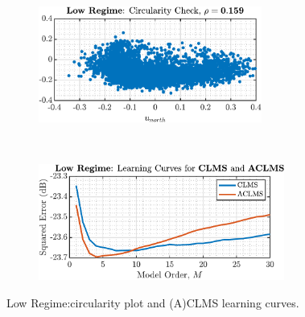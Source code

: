 \begin{enumerate}[label=\alph*), leftmargin=*]
\begin{figure}[h]
    \centering
    \begin{subfigure}{0.49\textwidth}
        \centering
        \includegraphics[height=1.5in]{report/widely-linear-filtering-and-adaptive-spectrum-estimation/complex-LMS-and-widely-linear-modelling/assets/b/circularity_1}
    \end{subfigure}
    ~
    \begin{subfigure}{0.49\textwidth}
        \centering
        \includegraphics[height=1.5in]{report/widely-linear-filtering-and-adaptive-spectrum-estimation/complex-LMS-and-widely-linear-modelling/assets/b/learning_curves_1}
    \end{subfigure}
    \caption{Low Regime:circularity plot and (A)CLMS learning curves.}
    \label{fig:4_1_b_1}
\end{figure}


\end{enumerate}
